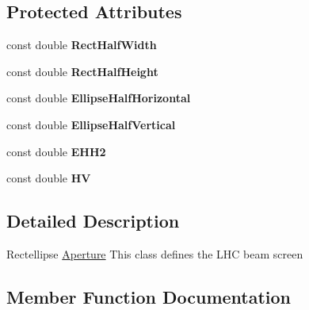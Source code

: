 \subsection*{Protected Attributes}
\begin{DoxyCompactItemize}
\item 
\mbox{\label{classRectEllipseAperture_a18a4d399eecff1b88d2a1c2873241b5c}} 
const double {\bfseries Rect\+Half\+Width}
\item 
\mbox{\label{classRectEllipseAperture_a6291fe35ddea612090a0cc4cbe611b35}} 
const double {\bfseries Rect\+Half\+Height}
\item 
\mbox{\label{classRectEllipseAperture_af4117212b527262c395e65d414cb8725}} 
const double {\bfseries Ellipse\+Half\+Horizontal}
\item 
\mbox{\label{classRectEllipseAperture_a86196d64d0b4f36d7abd5cd13376ef20}} 
const double {\bfseries Ellipse\+Half\+Vertical}
\item 
\mbox{\label{classRectEllipseAperture_a31610fc966b9ec09a8e86d65b7bac708}} 
const double {\bfseries E\+H\+H2}
\item 
\mbox{\label{classRectEllipseAperture_a05b1938a5cfac44daa43a9d283719f66}} 
const double {\bfseries HV}
\end{DoxyCompactItemize}


\subsection{Detailed Description}
Rectellipse \hyperlink{classAperture}{Aperture} This class defines the L\+HC beam screen 

\subsection{Member Function Documentation}
\mbox{\label{classRectEllipseAperture_a983dec943872b82aa91f74cd10558207}} 
